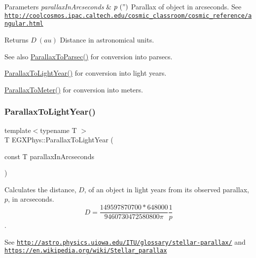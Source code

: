 \begin{DoxyParams}{Parameters}
{\em parallax\+In\+Arcseconds} & $ p\ (")$ Parallax of object in arcseconds. See \href{http://coolcosmos.ipac.caltech.edu/cosmic_classroom/cosmic_reference/angular.html}{\tt http\+://coolcosmos.\+ipac.\+caltech.\+edu/cosmic\+\_\+classroom/cosmic\+\_\+reference/angular.\+html} \\
\hline
\end{DoxyParams}
\begin{DoxyReturn}{Returns}
$ D\ (au)$ Distance in astronomical units. 
\end{DoxyReturn}
\begin{DoxySeeAlso}{See also}
\mbox{\hyperlink{group___e_g_x_phys-_astrophysic-_parallax_gab42dbec142e1a47925fc45e899845861}{Parallax\+To\+Parsec()}} for conversion into parsecs. 

\mbox{\hyperlink{group___e_g_x_phys-_astrophysic-_parallax_gacaec31498f264e2a1dc285062a394de2}{Parallax\+To\+Light\+Year()}} for conversion into light years. 

\mbox{\hyperlink{group___e_g_x_phys-_astrophysic-_parallax_ga94912bf8b98a04cccab8ef19eaa89b6a}{Parallax\+To\+Meter()}} for conversion into meters. 
\end{DoxySeeAlso}
\mbox{\label{group___e_g_x_phys-_astrophysic-_parallax_gacaec31498f264e2a1dc285062a394de2}} 
\subsubsection{\texorpdfstring{Parallax\+To\+Light\+Year()}{ParallaxToLightYear()}}
{\footnotesize\ttfamily template$<$typename T $>$ \\
T E\+G\+X\+Phys\+::\+Parallax\+To\+Light\+Year (\begin{DoxyParamCaption}\item[{const T}]{parallax\+In\+Arcseconds }\end{DoxyParamCaption})}



Calculates the distance, $D$, of an object in light years from its observed parallax, $p$, in arcseconds. \[ D=\dfrac{149597870700 * 648000}{9460730472580800 \pi} \dfrac{1}{p}\]. 

See \href{http://astro.physics.uiowa.edu/ITU/glossary/stellar-parallax/}{\tt http\+://astro.\+physics.\+uiowa.\+edu/\+I\+T\+U/glossary/stellar-\/parallax/} and \href{https://en.wikipedia.org/wiki/Stellar_parallax}{\tt https\+://en.\+wikipedia.\+org/wiki/\+Stellar\+\_\+parallax}

